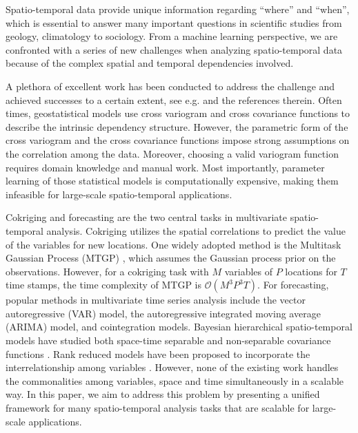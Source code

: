 Spatio-temporal data provide unique information regarding ``where'' and ``when'', which is essential to answer many important  questions in scientific studies from geology, climatology to sociology. From a machine learning perspective, we are confronted with a series of new challenges when analyzing spatio-temporal data because of the complex spatial and temporal dependencies involved. 

A plethora of excellent work has been conducted to address the challenge and achieved successes to a certain extent, see e.g. \cite{cressie2010fixed, isaaks2011applied} and the references therein. Often times, geostatistical models use cross variogram and cross covariance functions to describe the intrinsic dependency structure. However, the parametric form of the cross variogram and the cross covariance functions impose strong assumptions on the correlation among the data. Moreover, choosing a valid variogram function requires domain knowledge and manual work. Most importantly, parameter learning of those statistical models is computationally expensive, making them infeasible for  large-scale spatio-temporal applications. 

Cokriging and forecasting are the two central tasks in multivariate spatio-temporal analysis. Cokriging utilizes the spatial correlations to predict the value of the variables for new locations. One widely adopted method is the  Multitask Gaussian Process (MTGP) \cite{bonilla2007multi}, which assumes the Gaussian process prior on the observations. However, for a cokriging task with $M$ variables of $P$ locations for $T$ time stamps, the time complexity of MTGP is $\mathcal{O}(M^3P^3T)$. 
For forecasting,  popular methods in multivariate time series analysis include the vector autoregressive (VAR) model, the autoregressive integrated moving average (ARIMA) model, and cointegration models. Bayesian hierarchical spatio-temporal models have studied both space-time separable and non-separable covariance functions \cite{cressie1999classes}. Rank reduced models have been proposed to incorporate the interrelationship among variables \cite{anderson1951estimating}. However, none of the existing work handles the commonalities among variables, space and time simultaneously in a scalable way. In this paper, we aim to address this problem by presenting a unified framework for many spatio-temporal analysis tasks that are scalable for large-scale applications. %

